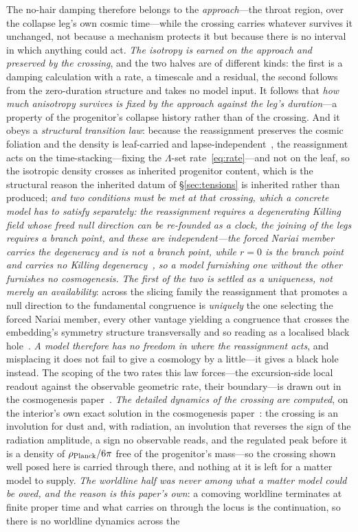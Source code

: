 \documentclass[11pt,a4paper]{article}
\theoremstyle{plain}
\theoremstyle{definition}
\theoremstyle{remark}
\begin{document}
The no-hair damping therefore belongs to the \emph{approach}---the throat region, over the collapse leg's own cosmic time---while the crossing carries whatever survives it unchanged, not because a mechanism protects it but because there is no interval in which anything could act. \emph{The isotropy is earned on the approach and preserved by the crossing}, and the two halves are of different kinds: the first is a damping calculation with a rate, a timescale and a residual, the second follows from the zero-duration structure and takes no model input. It follows that \emph{how much anisotropy survives is fixed by the approach against the leg's duration}---a property of the progenitor's collapse history rather than of the crossing. And it obeys a \emph{structural transition law}: because the reassignment preserves the cosmic foliation and the density is leaf-carried and lapse-independent~\cite{JanzenOperator}, the reassignment acts on the time-stacking---fixing the $\Lambda$-set rate~\eqref{eq:rate}---and not on the leaf, so the isotropic density crosses as inherited progenitor content, which is the structural reason the inherited datum of \S\ref{sec:tensions} is inherited rather than produced; \emph{and two conditions must be met at that crossing, which a concrete model has to satisfy separately: the reassignment requires a degenerating Killing field whose freed null direction can be re-founded as a clock, the joining of the legs requires a branch point, and these are independent---the forced Nariai member carries the degeneracy and is not a branch point, while $r=0$ is the branch point and carries no Killing degeneracy~\cite{JanzenDynamics}, so a model furnishing one without the other furnishes no cosmogenesis.} \emph{The first of the two is settled as a uniqueness, not merely an availability}: across the slicing family the reassignment that promotes a null direction to the fundamental congruence is \emph{uniquely} the one selecting the forced Nariai member, every other vantage yielding a congruence that crosses the embedding's symmetry structure transversally and so reading as a localised black hole~\cite{JanzenGroupoid}. \emph{A model therefore has no freedom in where the reassignment acts}, and misplacing it does not fail to give a cosmology by a little---it gives a black hole instead. The scoping of the two rates this law forces---the excursion-side local readout against the observable geometric rate, their boundary---is drawn out in the cosmogenesis paper~\cite{JanzenCosmogenesis}. \emph{The detailed dynamics of the crossing are computed}, on the interior's own exact solution in the cosmogenesis paper~\cite{JanzenCosmogenesis}: the crossing is an involution for dust and, with radiation, an involution that reverses the sign of the radiation amplitude, a sign no observable reads, and the regulated peak before it is a density of $\rho_{\rm Planck}/6\pi$ free of the progenitor's mass---so the crossing shown well posed here is carried through there, and nothing at it is left for a matter model to supply. \emph{The worldline half was never among what a matter model could be owed, and the reason is this paper's own}: a comoving worldline terminates at finite proper time and what carries on through the locus is the continuation, so there is no worldline dynamics across the 
\end{document}
